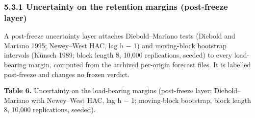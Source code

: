 \documentclass[11pt]{article}
\begin{document}
\subsubsection{5.3.1 Uncertainty on the retention margins (post-freeze
layer)}\label{uncertainty-on-the-retention-margins-post-freeze-layer}

A post-freeze uncertainty layer attaches Diebold--Mariano tests (Diebold
and Mariano 1995; Newey--West HAC, lag h \ensuremath{-} 1) and moving-block bootstrap
intervals (K\"unsch 1989; block length 8, 10,000 replications, seeded) to
every load-bearing margin, computed from the archived per-origin
forecast files. It is labelled post-freeze and changes no frozen
verdict.

\textbf{Table 6.} Uncertainty on the load-bearing margins (post-freeze
layer; Diebold--Mariano with Newey--West HAC, lag h \ensuremath{-} 1; moving-block
bootstrap, block length 8, 10,000 replications, seeded).
\end{document}
